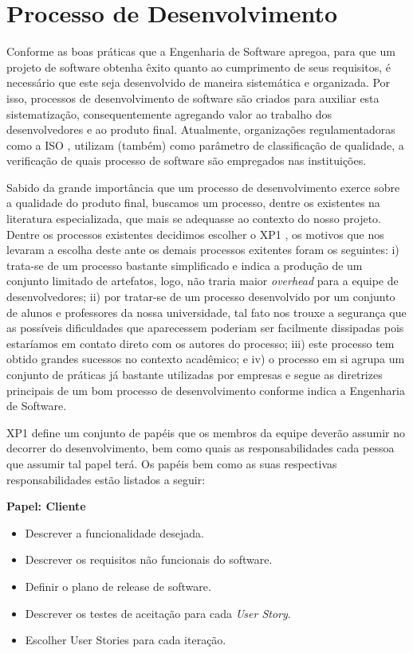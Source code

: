 \chapter{Processo de Desenvolvimento}

Conforme as boas práticas que a Engenharia de Software apregoa, para que um projeto de software obtenha êxito quanto ao cumprimento de seus requisitos, é necessário que este seja desenvolvido de maneira sistemática e organizada. Por isso, processos de desenvolvimento de software são criados para auxiliar esta sistematização, consequentemente agregando valor ao trabalho dos desenvolvedores e ao produto final. Atualmente, organizações regulamentadoras como a ISO \cite{iso}, utilizam (também) como parâmetro de classificação de qualidade, a verificação de quais processo de software são empregados nas instituições.

Sabido da grande importância que um processo de desenvolvimento exerce sobre a qualidade do produto final, buscamos um processo, dentre os existentes na literatura especializada, que mais se adequasse ao contexto do nosso projeto. Dentre os processos existentes decidimos escolher o XP1 \cite{xp1}, os motivos que nos levaram a escolha deste ante os demais processos exitentes foram os seguintes: i) trata-se de um processo bastante simplificado e indica a produção de um conjunto limitado de artefatos, logo, não traria maior \textit{overhead} para a equipe de desenvolvedores; ii) por tratar-se de um processo desenvolvido por um conjunto de alunos e professores da nossa universidade, tal fato nos trouxe a segurança que as possíveis dificuldades que aparecessem poderiam ser facilmente dissipadas pois estaríamos em contato direto com os autores do processo; iii) este processo tem obtido grandes sucessos no contexto acadêmico; e iv) o processo em si agrupa um conjunto de práticas já bastante utilizadas por empresas e segue as diretrizes principais de um bom processo de desenvolvimento conforme indica a Engenharia de Software.

XP1 define um conjunto de papéis que os membros da equipe deverão assumir no decorrer do desenvolvimento, bem como quais as responsabilidades  cada pessoa que assumir tal papel terá. Os papéis bem como as suas respectivas responsabilidades estão listados a seguir:

\textbf{Papel: Cliente}
\begin{itemize}
 \item Descrever a funcionalidade desejada.
 \item Descrever os requisitos não funcionais do software.
 \item Definir o plano de release de software.
 \item Descrever os testes de aceitação para cada \textit{User Story}.
 \item Escolher User Stories para cada iteração.
\end{itemize}

